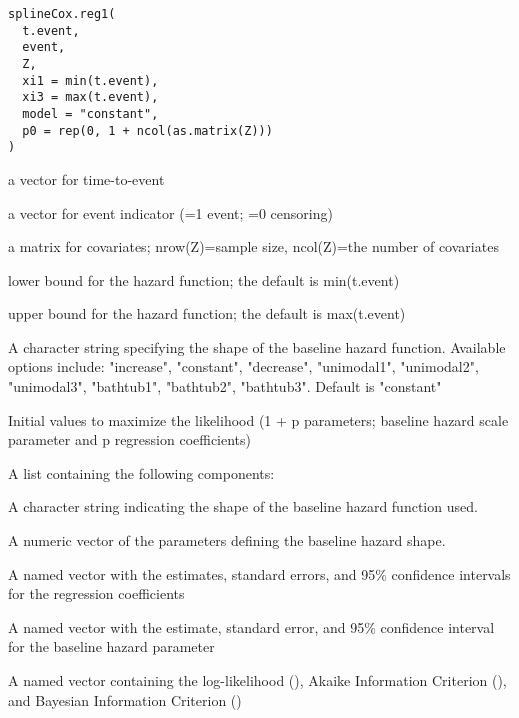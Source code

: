 \documentclass[a4paper]{book}
\begin{document}
%
\begin{Usage}
\begin{verbatim}
splineCox.reg1(
  t.event,
  event,
  Z,
  xi1 = min(t.event),
  xi3 = max(t.event),
  model = "constant",
  p0 = rep(0, 1 + ncol(as.matrix(Z)))
)
\end{verbatim}
\end{Usage}
%
\begin{Arguments}
\begin{ldescription}
\item[\code{t.event}] a vector for time-to-event

\item[\code{event}] a vector for event indicator (=1 event; =0 censoring)

\item[\code{Z}] a matrix for covariates; nrow(Z)=sample size, ncol(Z)=the number of covariates

\item[\code{xi1}] lower bound for the hazard function; the default is min(t.event)

\item[\code{xi3}] upper bound for the hazard function; the default is max(t.event)

\item[\code{model}] A character string specifying the shape of the baseline hazard function. Available options include:
"increase", "constant", "decrease", "unimodal1", "unimodal2", "unimodal3", "bathtub1", "bathtub2", "bathtub3".
Default is "constant"

\item[\code{p0}] Initial values to maximize the likelihood (1 + p parameters; baseline hazard scale parameter and p regression coefficients)
\end{ldescription}
\end{Arguments}
%
\begin{Value}
A list containing the following components:
\begin{ldescription}
\item[\code{model}] A character string indicating the shape of the baseline hazard function used.
\item[\code{parameter}] A numeric vector of the parameters defining the baseline hazard shape.
\item[\code{beta}] A named vector with the estimates, standard errors, and 95\% confidence intervals for the regression coefficients
\item[\code{gamma}] A named vector with the estimate, standard error, and 95\% confidence interval for the baseline hazard parameter
\item[\code{loglik}] A named vector containing the log-likelihood (),
Akaike Information Criterion (), and Bayesian Information
Criterion ()
\end{ldescription}
\end{Value}
\end{document}
